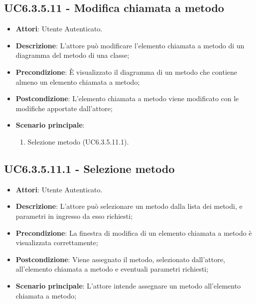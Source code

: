 \subsection{UC6.3.5.11 - Modifica chiamata a metodo} 
\label{ssec:UC6.3.5.11} 
\begin{itemize} 
\item \textbf{Attori}: Utente Autenticato.
\item \textbf{Descrizione}: L'attore può modificare l'elemento chiamata a metodo di un diagramma del metodo di una classe;
\item \textbf{Precondizione}: È visualizzato il diagramma di un metodo che contiene almeno un elemento chiamata a metodo;
\item \textbf{Postcondizione}: L'elemento chiamata a metodo viene modificato con le modifiche apportate dall'attore;
\item \textbf{Scenario principale}: \begin{enumerate}\item Selezione metodo (UC6.3.5.11.1). 
 \end{enumerate}
\end{itemize} 
\subsection{UC6.3.5.11.1 - Selezione metodo} 
\label{ssec:UC6.3.5.11.1} 
\begin{itemize} 
\item \textbf{Attori}: Utente Autenticato.
\item \textbf{Descrizione}: L'attore può selezionare un metodo dalla lista dei metodi, e parametri in ingresso da esso richiesti;
\item \textbf{Precondizione}: La finestra di modifica di un elemento chiamata a metodo è visualizzata correttamente;
\item \textbf{Postcondizione}: Viene assegnato il metodo, selezionato dall'attore, all'elemento chiamata a metodo e eventuali parametri richiesti;
\item \textbf{Scenario principale}: L'attore intende assegnare un metodo all'elemento chiamata a metodo;\end{itemize} 
